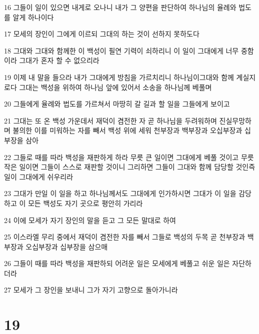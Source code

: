 \par 16 그들이 일이 있으면 내게로 오나니 내가 그 양편을 판단하여 하나님의 율례와 법도를 알게 하나이다
\par 17 모세의 장인이 그에게 이르되 그대의 하는 것이 선하지 못하도다
\par 18 그대와 그대와 함께한 이 백성이 필연 기력이 쇠하리니 이 일이 그대에게 너무 중함이라 그대가 혼자 할 수 없으리라
\par 19 이제 내 말을 들으라 내가 그대에게 방침을 가르치리니 하나님이그대와 함께 계실지로다 그대는 백성을 위하여 하나님 앞에 있어서 소송을 하나님께 베풀며
\par 20 그들에게 율례와 법도를 가르쳐서 마땅히 갈 길과 할 일을 그들에게 보이고
\par 21 그대는 또 온 백성 가운데서 재덕이 겸전한 자 곧 하나님을 두려워하며 진실무망하며 불의한 이를 미워하는 자를 빼서 백성 위에 세워 천부장과 백부장과 오십부장과 십부장을 삼아
\par 22 그들로 때를 따라 백성을 재판하게 하라 무릇 큰 일이면 그대에게 베풀 것이고 무릇 작은 일이면 그들이 스스로 재판할 것이니 그리하면 그들이 그대와 함께 담당할 것인즉 일이 그대에게 쉬우리라
\par 23 그대가 만일 이 일을 하고 하나님께서도 그대에게 인가하시면 그대가 이 일을 감당하고 이 모든 백성도 자기 곳으로 평안히 가리라
\par 24 이에 모세가 자기 장인의 말을 듣고 그 모든 말대로 하여
\par 25 이스라엘 무리 중에서 재덕이 겸전한 자를 빼서 그들로 백성의 두목 곧 천부장과 백부장과 오십부장과 십부장을 삼으매
\par 26 그들이 때를 따라 백성을 재판하되 어려운 일은 모세에게 베풀고 쉬운 일은 자단하더라
\par 27 모세가 그 장인을 보내니 그가 자기 고향으로 돌아가니라

\chapter{19}

